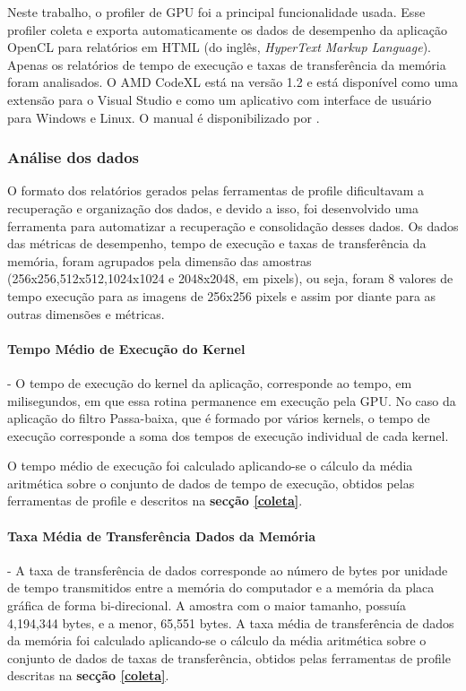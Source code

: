Neste trabalho, o profiler de GPU foi a principal funcionalidade usada. Esse profiler coleta e exporta automaticamente os dados de desempenho da aplicação OpenCL para relatórios em HTML (do inglês, \textit{HyperText Markup Language}). Apenas os relatórios de tempo de execução e taxas de transferência da memória foram analisados. O AMD CodeXL está na versão 1.2 e está disponível como uma extensão para o Visual Studio e como um aplicativo com interface de usuário para Windows e Linux. O manual é disponibilizado por \cite{AMDCodeXL}.
\subsubsection{Análise dos dados}
O formato dos relatórios gerados pelas ferramentas de profile dificultavam a recuperação e organização dos dados,  e devido a isso, foi desenvolvido uma ferramenta para automatizar a recuperação e consolidação desses dados. Os dados das métricas de desempenho, tempo de execução e taxas de transferência da memória, foram agrupados pela dimensão das amostras (256x256,512x512,1024x1024 e 2048x2048, em pixels), ou seja, foram 8 valores de tempo execução para as imagens de 256x256 pixels e assim por diante para as outras dimensões e métricas.
\paragraph{Tempo Médio de Execução do Kernel} - O tempo de execução do kernel da aplicação, corresponde ao tempo, em milisegundos, em que essa rotina permanence em execução pela GPU. No caso da aplicação do filtro Passa-baixa, que é formado por vários kernels, o tempo de execução corresponde a soma dos tempos de execução individual de cada kernel.

O tempo médio de execução foi calculado aplicando-se o cálculo da média aritmética sobre o conjunto de dados de tempo de execução, obtidos pelas ferramentas de profile e descritos na \textbf{secção \ref{coleta}}.
\paragraph{Taxa Média de Transferência Dados da Memória} - A taxa de transferência de dados corresponde ao número de bytes por unidade de tempo transmitidos entre a memória do computador e a memória da placa gráfica de forma bi-direcional. A amostra com o maior tamanho, possuía 4,194,344 bytes,  e a menor, 65,551 bytes.
A taxa média de transferência de dados da memória foi calculado aplicando-se o cálculo da média aritmética sobre o conjunto de dados de taxas de transferência, obtidos pelas ferramentas de profile descritas na \textbf{secção \ref{coleta}}. 
\FloatBarrier
